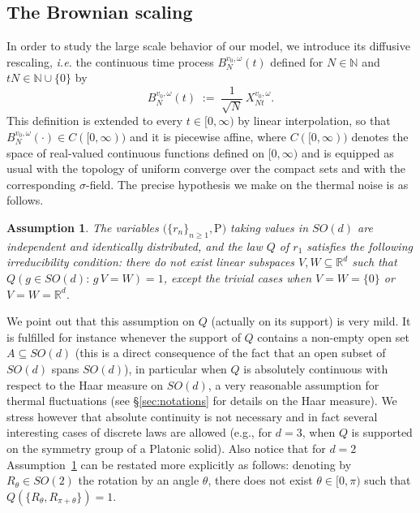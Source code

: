 \documentclass[a4paper,reqno,11pt]{amsart}
\numberwithin{equation}{section}
\newtheorem{assumption}[theorem]{Assumption}
\newcommand{\gs}{\sigma}
\newcommand{\go}{\omega}
\newcommand{\R}{\mathbb{R}}
\newcommand{\N}{\mathbb{N}}
\def\bP{\ensuremath{\bs{\mathrm{P}}}}
\def\bs{\boldsymbol}
\begin{document}
\smallskip


\smallskip

\subsection{The Brownian scaling}

In order to study the large scale behavior of our model,
we introduce its diffusive rescaling, {\sl i.e.} the
continuous time process $B_{N}^{v_0, \go}(t)$ defined for $N \in \N$ 
and $tN\in \N\cup \{0\}$ by
\begin{equation} \label{eq:BN}
	B_{N}^{v_0, \go}(t) \; :=\;
	\frac{1}{\sqrt N} \, X^{v_0, \omega}_{ Nt } .
\end{equation}
This definition is extended to every 
$t \in [0, \infty)$ by linear interpolation,
so that $B_{N}^{v_0, \go}(\cdot)\in C([0,\infty))$ and it is piecewise affine,
where $C([0,\infty))$ denotes the space of
real-valued continuous functions defined on $[0,\infty)$ and is
equipped as usual with the topology of
uniform converge over the compact sets and with the
corresponding $\gs$-field. The precise hypothesis we make on
the thermal noise is as follows.

\medskip
\begin{assumption} \rm \label{ass:noise}
The variables $\big(\{r_n\}_{n\ge 1}, \bP \big)$ taking values in $SO(d)$ are independent
and identically distributed, and the 
law $Q$ of $r_1$ satisfies the following irreducibility condition:
there do not exist linear subspaces $V, W \subseteq \R^d$ such that
$Q(g \in SO(d): \, g\, V = W) = 1$, except the trivial cases when
$V = W = \{0\}$ or $V = W = \R^d$.
\end{assumption}

\smallskip

\noindent
We point out that this assumption on $Q$ (actually on its support) is very mild.
It is fulfilled for instance whenever the
support of $Q$ contains a non-empty open set $A \subseteq SO(d)$
(this is a direct consequence of the fact that an open subset of $SO(d)$
spans $SO(d)$), in particular when
$Q$ is absolutely continuous with respect to the
Haar measure on $SO(d)$, a very reasonable
assumption for thermal fluctuations (see \S\ref{sec:notations}
for details on the Haar measure). We stress however that 
absolute continuity is not necessary and in fact
several interesting cases of discrete laws are allowed (e.g.,
for $d=3$, when $Q$ is supported on the symmetry group of a Platonic solid).
Also notice that for $d=2$ Assumption~\ref{ass:noise} can be restated
more explicitly as follows: denoting by $R_{\theta} \in SO(2)$ the rotation by an
angle $\theta$, there does not exist $\theta \in [0,\pi)$ such
that $Q(\{R_{\theta}, R_{\pi + \theta}\})=1$.
\end{document}
